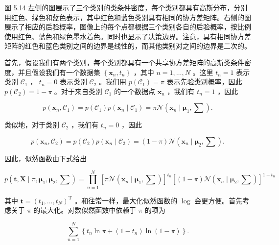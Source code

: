 \documentclass[10pt]{report}
\begin{document}
图 5.14 左侧的图展示了三个类别的类条件密度，每个类别都具有高斯分布，分别用红色、绿色和蓝色表示，其中红色和蓝色类别具有相同的协方差矩阵。右侧的图展示了相应的后验概率，图像上的每个点都根据三个类别各自的后验概率，按比例使用红色、蓝色和绿色墨水着色。同时也显示了决策边界。注意，具有相同协方差矩阵的红色和蓝色类别之间的边界是线性的，而其他类别对之间的边界是二次的。

首先，假设我们有两个类别，每个类别都具有一个共享协方差矩阵的高斯类条件密度，并且假设我们有一个数据集 \(\left\{  {{\mathbf{x}}_{n},{t}_{n}}\right\}\) ，其中 \(n = 1,\ldots ,N\) 。这里 \({t}_{n} = 1\) 表示类别 \({\mathcal{C}}_{1}\) ， \({t}_{n} = 0\) 表示类别 \({\mathcal{C}}_{2}\) 。我们用 \(p\left( {\mathcal{C}}_{1}\right)  = \pi\) 表示先验类别概率，因此 \(p\left( {\mathcal{C}}_{2}\right)  = 1 - \pi\) 。对于来自类别 \({\mathcal{C}}_{1}\) 的一个数据点 \({\mathbf{x}}_{n}\) ，我们有 \({t}_{n} = 1\) ，因此

\[
p\left( {{\mathbf{x}}_{n},{\mathcal{C}}_{1}}\right)  = p\left( {\mathcal{C}}_{1}\right) p\left( {{\mathbf{x}}_{n} \mid  {\mathcal{C}}_{1}}\right)  = \pi \mathcal{N}\left( {{\mathbf{x}}_{n} \mid  {\mathbf{\mu }}_{1},\mathbf{\sum }}\right) .
\]

类似地，对于类别 \({\mathcal{C}}_{2}\) ，我们有 \({t}_{n} = 0\) ，因此

\[
p\left( {{\mathbf{x}}_{n},{\mathcal{C}}_{2}}\right)  = p\left( {\mathcal{C}}_{2}\right) p\left( {{\mathbf{x}}_{n} \mid  {\mathcal{C}}_{2}}\right)  = \left( {1 - \pi }\right) \mathcal{N}\left( {{\mathbf{x}}_{n} \mid  {\mathbf{\mu }}_{2},\mathbf{\sum }}\right) .
\]

因此，似然函数由下式给出

\[
p\left( {\mathbf{t},\mathbf{X} \mid  \pi ,{\mathbf{\mu }}_{1},{\mathbf{\mu }}_{2},\mathbf{\sum }}\right)  = \mathop{\prod }\limits_{{n = 1}}^{N}{\left\lbrack  \pi \mathcal{N}\left( {\mathbf{x}}_{n} \mid  {\mathbf{\mu }}_{1},\mathbf{\sum }\right) \right\rbrack  }^{{t}_{n}}{\left\lbrack  \left( 1 - \pi \right) \mathcal{N}\left( {\mathbf{x}}_{n} \mid  {\mathbf{\mu }}_{2},\mathbf{\sum }\right) \right\rbrack  }^{1 - {t}_{n}} \tag{5.54}
\]

其中 \(\mathbf{t} = {\left( {t}_{1},\ldots ,{t}_{N}\right) }^{\mathrm{T}}\) 。和往常一样，最大化似然函数的 \(\log\) 会更方便。首先考虑关于 \(\pi\) 的最大化。对数似然函数中依赖于 \(\pi\) 的项为

\[
\mathop{\sum }\limits_{{n = 1}}^{N}\left\{  {{t}_{n}\ln \pi  + \left( {1 - {t}_{n}}\right) \ln \left( {1 - \pi }\right) }\right\}  . \tag{5.55}
\]
\end{document}

